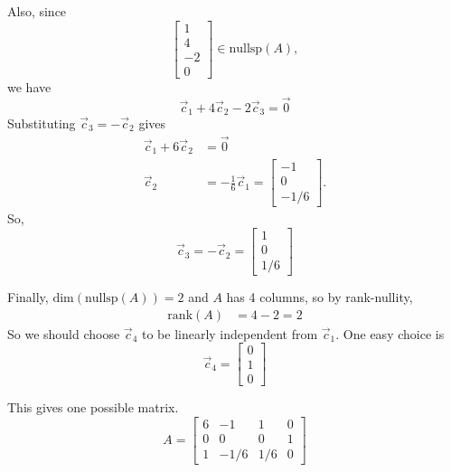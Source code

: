 \documentclass[11pt]{article}
\begin{document}
\begin{prob}[(10 pts)]
\begin{solution}
Also, since
\[
\begin{bmatrix} 1 \\ 4 \\ -2 \\ 0 \end{bmatrix} \in \text{nullsp}(A),
\]
we have
\[
\vec c_1 + 4\vec c_2 - 2\vec c_3 = \vec 0
\]
Substituting $\vec c_3 = -\vec c_2$ gives
\begin{align*}
\vec c_1 + 6\vec c_2 &= \vec 0 \\
\vec c_2 &= -\frac{1}{6}\vec c_1 = \begin{bmatrix} -1 \\ 0 \\ -1/6 \end{bmatrix}.
\end{align*}
So,
\[
\vec c_3 = -\vec c_2 = \begin{bmatrix} 1 \\ 0 \\ 1/6 \end{bmatrix}
\]

Finally, $\text{dim}(\text{nullsp}(A)) = 2$ and $A$ has 4 columns, so by rank-nullity,
\begin{align*}
\text{rank}(A) &= 4 - 2 = 2
\end{align*}
So we should choose $\vec c_4$ to be linearly independent from $\vec c_1$. One easy choice is
\[
\vec c_4 = \begin{bmatrix} 0 \\ 1 \\ 0 \end{bmatrix}
\]

This gives one possible matrix.
\[
\boxed{
A = \begin{bmatrix}
6 & -1 & 1 & 0 \\
0 & 0 & 0 & 1 \\
1 & -1/6 & 1/6 & 0
\end{bmatrix}
}
\]
\end{solution}

\end{prob}
\end{document}
